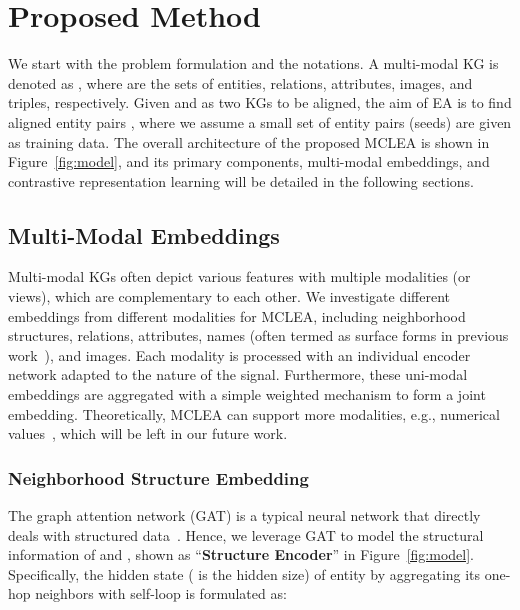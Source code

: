 \documentclass[11pt]{article}
\begin{document}
\section{Proposed Method}





We start with the problem formulation and the notations.
A multi-modal KG is denoted as , where  are the sets of entities, relations, attributes, images, and triples, respectively. 
Given  and  as two KGs to be aligned, the aim of EA is to find aligned entity pairs , where we assume a small set of entity pairs  (seeds) are given as training data.
The overall architecture of the proposed MCLEA is shown in Figure~\ref{fig:model}, and its primary components, multi-modal embeddings, and contrastive representation learning will be detailed in the following sections.



\subsection{Multi-Modal Embeddings}
\label{sec:embedding}

Multi-modal KGs often depict various features with multiple modalities (or views), which are complementary to each other. 
We investigate different embeddings from different modalities for MCLEA, including neighborhood structures, relations, attributes, names (often termed as surface forms in previous work~\cite{liu2021visual}), and images.
Each modality is processed with an individual encoder network adapted to the nature of the signal. 
Furthermore, these uni-modal embeddings are aggregated with a simple weighted mechanism to form a joint embedding.
Theoretically, MCLEA can support more modalities, e.g., numerical values~\cite{chen2020mmea}, which will be left in our future work.

\subsubsection{Neighborhood Structure Embedding}

The graph attention network (GAT) is a typical neural network that directly deals with structured data~\cite{velivckovic2018graph}.
Hence, we leverage GAT to model the structural information of  and , shown as ``\textbf{Structure Encoder}'' in Figure~\ref{fig:model}.
Specifically, the hidden state  ( is the hidden size) of entity  by aggregating its one-hop neighbors  with self-loop is formulated as:
\end{document}
